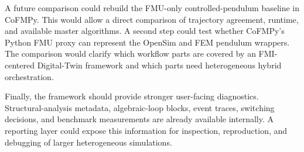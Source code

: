 A future comparison could rebuild the \ac{FMU}-only controlled-pendulum baseline in CoFMPy.
This would allow a direct comparison of trajectory agreement, runtime, and available master algorithms.
A second step could test whether CoFMPy's Python \ac{FMU} proxy can represent the OpenSim and \ac{FEM} pendulum wrappers.
The comparison would clarify which workflow parts are covered by an \ac{FMI}-centered Digital-Twin framework and which parts need heterogeneous hybrid orchestration.

Finally, the framework should provide stronger user-facing diagnostics.
Structural-analysis metadata, algebraic-loop blocks, event traces, switching decisions, and benchmark measurements are already available internally.
A reporting layer could expose this information for inspection, reproduction, and debugging of larger heterogeneous simulations.

